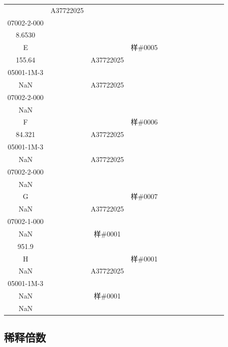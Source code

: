 \documentclass[UTF8,10pt,a4paper,fontset=fandol]{ctexart}
\newcommand{\fieldvalue}[1]{#1}
\begin{document}
\begin{tabular}{c|*{12}{c|}}
&%
\fieldvalue{\scriptsize A37722025\\07002-2-000\\8.6530}&
&&&&\\ \hline
E&&&%
\fieldvalue{\scriptsize 样\#0005\\155.64}&
&%
\fieldvalue{\scriptsize A37722025\\05001-1M-3\\NaN}&
&%
\fieldvalue{\scriptsize A37722025\\07002-2-000\\NaN}&
&&&&\\ \hline
F&&&%
\fieldvalue{\scriptsize 样\#0006\\84.321}&
&%
\fieldvalue{\scriptsize A37722025\\05001-1M-3\\NaN}&
&%
\fieldvalue{\scriptsize A37722025\\07002-2-000\\NaN}&
&&&&\\ \hline
G&&&%
\fieldvalue{\scriptsize 样\#0007\\NaN}&
&%
\fieldvalue{\scriptsize A37722025\\07002-1-000\\NaN}&
&%
\fieldvalue{\scriptsize 样\#0001\\951.9}&
&&&&\\ \hline
H&&&%
\fieldvalue{\scriptsize 样\#0001\\NaN}&
&%
\fieldvalue{\scriptsize A37722025\\05001-1M-3\\NaN}&
&%
\fieldvalue{\scriptsize 样\#0001\\NaN}&
&&&&\\ \hline
\end{tabular}

\subsection{稀释倍数}
\end{document}
